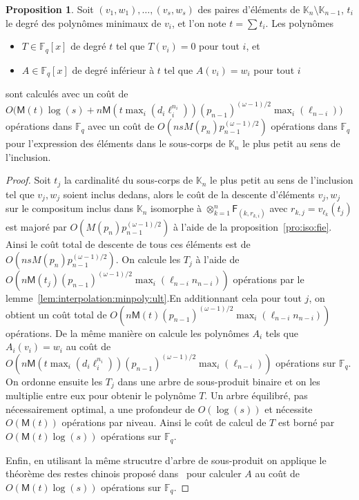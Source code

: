 \documentclass[10pt,a4paper]{book}
\theoremstyle{plain}
\theoremstyle{definition}
\theoremstyle{definition}
\theoremstyle{definition}
\newtheorem{prop}[thm]{Proposition}
\theoremstyle{definition}
\theoremstyle{remark}
\theoremstyle{remark}
\theoremstyle{definition}
\begin{document}
\begin{prop}
\label{pro:app:int}
  Soit $(v_1,w_1),\dots,(v_s,w_s)$ des paires d'éléments de $\mathbb{K}_n 
  \setminus \mathbb{K}_{n-1}$, $t_i$ le degré des polynômes minimaux de $v_i$, 
  et l'on note  $t=\sum t_i$. 
  Les polynômes
  \begin{itemize}
  \item $T\in \mathbb{F}_q[x]$ de degré $t$ tel que $T(v_i)=0$ pour tout $i$,
    et
  \item $A\in \mathbb{F}_q[x]$ de degré inférieur à $t$ tel que $A(v_i)=w_i$ pour
    tout $i$
  \end{itemize}
  sont calculés avec un coût de
  $O\bigl(\mathsf{M}(t)\log(s) + n\mathsf{M}(t \max_i(d_i\ell_i^{n_i}))(p_{n-1})^{(\omega-1)/2} \max_{i}(\ell_{n-i})\bigr)$ 
  opérations dans $\mathbb{F}_q$ avec un coût de 
  $O(nsM(p_n)p_{n-1}^{(\omega-1)/2})$ opérations dans $\mathbb{F}_q$ pour 
  l'expression des éléments dans le sous-corps de $\mathbb{K}_n$ le plus petit 
  au sens de l'inclusion.
\end{prop}
\begin{proof}
  Soit $t_j$ la cardinalité du sous-corps de $\mathbb{K}_n$ le plus petit au 
  sens  de l'inclusion tel que $v_j,w_j$ soient inclus dedans, alors le coût de
  la descente d'éléments $v_j,w_j$ sur le compositum inclus dans $\mathbb{K}_n$ 
  isomorphe à $\otimes_{k=1}^n\mathsf{F}_{(k,r_{k,i})}$ avec 
  $r_{k,j}=v_{\ell_k}(t_j)$ est majoré par $O(M(p_n)p_{n-1}^{(\omega-1)/2})$ à 
  l'aide de la proposition~\ref{pro:iso:fie}. Ainsi le coût total de descente 
  de tous ces éléments est de $O(nsM(p_n)p_{n-1}^{(\omega-1)/2})$.
  On calcule les $T_j$ à l'aide de
   $O(n\mathsf{M}(t_j)(p_{n-1})^{(\omega-1)/2} \max_{i}(\ell_{n-i}n_{n-i}))$ 
  opérations par le lemme~\ref{lem:interpolation:minpoly:ult}.En additionnant 
  cela pour tout $j$, %
  on obtient un coût total de $O(n\mathsf{M}(t)(p_{n-1})^{(\omega-1)/2} \max_{i}(\ell_{n-i}n_{n-i}))$ opérations.
  De la même manière on calcule les polynômes $A_i$ tels que $A_i(v_i)=w_i$
  au coût de $O(n\mathsf{M}(t \max_i(d_i\ell_i^{n_i}))(p_{n-1})^{(\omega-1)/2} \max_{i}(\ell_{n-i}))$
  opérations sur $\mathbb{F}_q$.
  On ordonne ensuite les $T_j$ dans une arbre de sous-produit binaire et 
  on les multiplie entre eux pour obtenir le polynôme $T$. Un arbre équilibré, 
  pas nécessairement optimal, a une profondeur de $O(\log (s))$ et nécessite 
  $O(\mathsf{M}(t))$ opérations par niveau. Ainsi le coût de calcul de $T$ est 
  borné par $O(\mathsf{M}(t)\log(s))$ opérations sur $\mathbb{F}_q$.
  
  Enfin, en utilisant la même strucutre d'arbre de sous-produit on applique le 
  théorème des restes chinois proposé dans~\cite[Chapter~10]{vzGJG03} pour 
  calculer $A$ au coût de $O(\mathsf{M}(t)\log(s))$ opérations sur $\mathbb{F}_q$.
\end{proof}
\end{document}
